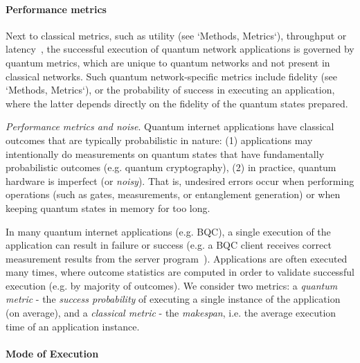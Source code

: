 \paragraph{Performance metrics}

Next to classical metrics, such as utility (see `Methods, Metrics`), throughput or latency~\cite{stankiewicz_commag}, the successful execution of quantum network applications is governed by quantum metrics, which are unique to quantum networks and not present in classical networks. Such quantum network-specific metrics include fidelity (see `Methods, Metrics`), or the probability of success in executing an application, where the latter depends directly on the fidelity of the quantum states prepared.

\textit{Performance metrics and noise}. Quantum internet applications have classical outcomes that are typically probabilistic in nature:
(1) applications may intentionally do measurements on quantum states that have fundamentally probabilistic outcomes (e.g. quantum cryptography),
(2) in practice, quantum hardware is imperfect (or \textit{noisy}). That is, undesired errors occur
when performing operations (such as gates, measurements, or entanglement generation) or when keeping quantum states in memory for too long.

In many quantum internet applications (e.g. BQC), a single execution of the application can result in failure or success (e.g. a BQC client receives correct measurement results from the server program~\cite{leichtle2021verifying}). Applications are often executed many times, where outcome statistics are computed in order to validate successful execution (e.g. by majority of outcomes).
We consider two metrics:
a \emph{quantum metric} -  the \textit{success probability} of executing a single instance of the application (on average), and a \emph{classical metric} -  the \textit{makespan}, i.e. the average execution time of an application instance.

\paragraph{Mode of Execution}

